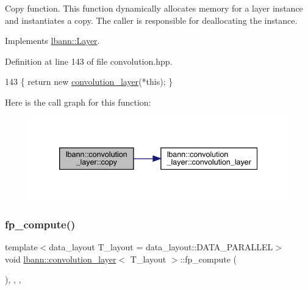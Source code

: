 Copy function. This function dynamically allocates memory for a layer instance and instantiates a copy. The caller is responsible for deallocating the instance. 

Implements \hyperlink{classlbann_1_1Layer_af420f22bbac801c85483ade84588a23f}{lbann\+::\+Layer}.



Definition at line 143 of file convolution.\+hpp.


\begin{DoxyCode}
143 \{ \textcolor{keywordflow}{return} \textcolor{keyword}{new} \hyperlink{classlbann_1_1convolution__layer_aad28b1304d9440fc50b3b54438587aa3}{convolution\_layer}(*\textcolor{keyword}{this}); \}
\end{DoxyCode}
Here is the call graph for this function\+:\nopagebreak
\begin{figure}[H]
\begin{center}
\leavevmode
\includegraphics[width=339pt]{classlbann_1_1convolution__layer_ac2d126a93bc690a959daed54658aabd5_cgraph}
\end{center}
\end{figure}
\mbox{\label{classlbann_1_1convolution__layer_aaca2c840fe41d8025efce91d6e9211b9}} 
\subsubsection{\texorpdfstring{fp\+\_\+compute()}{fp\_compute()}}
{\footnotesize\ttfamily template$<$data\+\_\+layout T\+\_\+layout = data\+\_\+layout\+::\+D\+A\+T\+A\+\_\+\+P\+A\+R\+A\+L\+L\+EL$>$ \\
void \hyperlink{classlbann_1_1convolution__layer}{lbann\+::convolution\+\_\+layer}$<$ T\+\_\+layout $>$\+::fp\+\_\+compute (\begin{DoxyParamCaption}{ }\end{DoxyParamCaption})\hspace{0.3cm}{\ttfamily [inline]}, {\ttfamily [override]}, {\ttfamily [protected]}, {\ttfamily [virtual]}}


